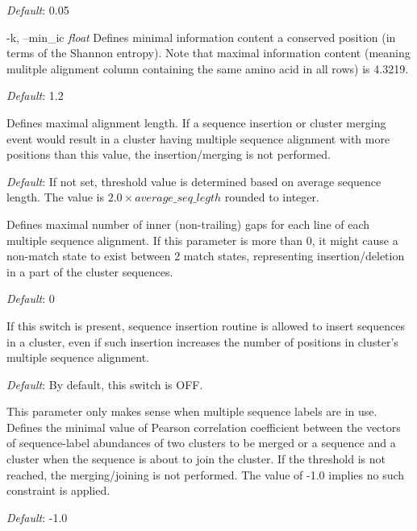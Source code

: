 \documentclass[11pt, a4paper, twoside, titlepage]{article}
\begin{document}
\begin{description}
	  	  \textit{Default}: 0.05
	  	  
\begin{sloppypar}	
	  	  
	  	  	  	  	  	  \item[-k, --min\_ic \rm \textlangle \textit{float}\textrangle] Defines minimal information content a conserved position (in terms of the Shannon entropy). Note that maximal information content (meaning mulitple alignment column containing the same amino acid in all rows) is 4.3219. 
	  	  	  	  	  	  
\end{sloppypar}	
	  	  
	  	  \textit{Default}: 1.2
	  	  	  	  
	  	  
	  	  	  	\item[-j, --max\_aln\_length \rm \textlangle \textit{int}\textrangle] Defines maximal alignment length. If a sequence insertion or cluster merging event would result in a cluster having multiple sequence alignment with more positions than this value, the insertion/merging is not performed.
	  	  	  	
	  	  	  	\textit{Default}: If not set, threshold value is determined based on average sequence length. The value is $2.0 \times average\_seq\_legth$ rounded to integer.
	  	  	  	
	  	  	  		  	  	  	\item[-u, --max\_inner\_gaps \rm \textlangle \textit{int}\textrangle]  Defines maximal number of inner (non-trailing) gaps for each line of each multiple sequence alignment. If this parameter is more than 0, it might cause a non-match state to exist between 2 match states, representing insertion/deletion in a part of the cluster sequences.
	  	  	  	
	  	  	  	\textit{Default}: 0
	  	  	  	
	  	  	  	\item[-q, --extension\_increase\_length] If this switch is present, sequence insertion routine is allowed to insert sequences in a cluster, even if such insertion increases the number of positions in cluster's multiple sequence alignment. 
	  	  	  	
	  	  	  	\textit{Default}: By default, this switch is OFF. 

	  	  
	  	  	  	  	  	  \item[-C, --min\_correlation \rm \textlangle \textit{float[-1.0, 1.0]}\textrangle] This parameter only makes sense when multiple sequence labels are in use. Defines the minimal value of Pearson correlation coefficient between the vectors of sequence-label abundances of two clusters to be merged or a sequence and a cluster when the sequence is about to join the cluster. If the threshold is not reached, the merging/joining is not performed. The value of -1.0 implies no such constraint is applied.
	  	  	  	  	  	  	
	  	  
	  	  \textit{Default}: -1.0
	  	  	  	  


\end{description}
\end{document}
